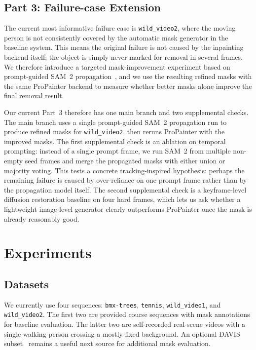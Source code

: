 \documentclass[10pt,twocolumn,letterpaper]{article}
\begin{document}
\subsection{Part 3: Failure-case Extension}
The current most informative failure case is \texttt{wild\_video2}, where the moving person is not consistently covered by the automatic mask generator in the baseline system.
This means the original failure is not caused by the inpainting backend itself; the object is simply never marked for removal in several frames.
We therefore introduce a targeted mask-improvement experiment based on prompt-guided SAM~2 propagation~\cite{ravi2024sam2}, and we use the resulting refined masks with the same ProPainter backend to measure whether better masks alone improve the final removal result.

Our current Part~3 therefore has one main branch and two supplemental checks.
The main branch uses a single prompt-guided SAM~2 propagation run to produce refined masks for \texttt{wild\_video2}, then reruns ProPainter with the improved masks.
The first supplemental check is an ablation on temporal prompting: instead of a single prompt frame, we run SAM~2 from multiple non-empty seed frames and merge the propagated masks with either union or majority voting.
This tests a concrete tracking-inspired hypothesis: perhaps the remaining failure is caused by over-reliance on one prompt frame rather than by the propagation model itself.
The second supplemental check is a keyframe-level diffusion restoration baseline on four hard frames, which lets us ask whether a lightweight image-level generator clearly outperforms ProPainter once the mask is already reasonably good.

\section{Experiments}
\subsection{Datasets}
We currently use four sequences:
\texttt{bmx-trees}, \texttt{tennis}, \texttt{wild\_video1}, and \texttt{wild\_video2}.
The first two are provided course sequences with mask annotations for baseline evaluation.
The latter two are self-recorded real-scene videos with a single walking person crossing a mostly fixed background.
An optional DAVIS subset~\cite{perazzi2016davis} remains a useful next source for additional mask evaluation.
\end{document}

